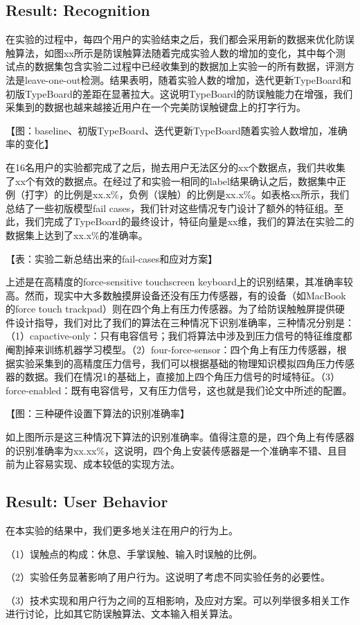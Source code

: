 \subsection{Result: Recognition}

在实验的过程中，每四个用户的实验结束之后，我们都会采用新的数据来优化防误触算法，如图xx所示是防误触算法随着完成实验人数的增加的变化，其中每个测试点的数据集包含实验二过程中已经收集到的数据加上实验一的所有数据，评测方法是leave-one-out检测。结果表明，随着实验人数的增加，迭代更新TypeBoard和初版TypeBoard的差距在显著拉大。这说明TypeBoard的防误触能力在增强，我们采集到的数据也越来越接近用户在一个完美防误触键盘上的打字行为。

【图：baseline、初版TypeBoard、迭代更新TypeBoard随着实验人数增加，准确率的变化】

在16名用户的实验都完成了之后，抛去用户无法区分的xx个数据点，我们共收集了xx个有效的数据点。在经过了和实验一相同的label结果确认之后，数据集中正例（打字）的比例是xx.x\%，负例（误触）的比例是xx.x\%。如表格xx所示，我们总结了一些初版模型fail cases，我们针对这些情况专门设计了额外的特征组。至此，我们完成了TypeBoard的最终设计，特征向量是xx维，我们的算法在实验二的数据集上达到了xx.x\%的准确率。

【表：实验二新总结出来的fail-cases和应对方案】

上述是在高精度的force-sensitive touchscreen keyboard上的识别结果，其准确率较高。然而，现实中大多数触摸屏设备还没有压力传感器，有的设备（如MacBook的force touch trackpad）则在四个角上有压力传感器。为了给防误触触屏提供硬件设计指导，我们对比了我们的算法在三种情况下识别准确率，三种情况分别是：（1）capactive-only：只有电容信号；我们将算法中涉及到压力信号的特征维度都阉割掉来训练机器学习模型。（2）four-force-sensor：四个角上有压力传感器，根据实验采集到的高精度压力信号，我们可以根据基础的物理知识模拟四角压力传感器的数据。我们在情况1的基础上，直接加上四个角压力信号的时域特征。（3）force-enabled：既有电容信号，又有压力信号，这也就是我们论文中所述的配置。

【图：三种硬件设置下算法的识别准确率】

如上图所示是这三种情况下算法的识别准确率。值得注意的是，四个角上有传感器的识别准确率为xx.xx\%，这说明，四个角上安装传感器是一个准确率不错、且目前为止容易实现、成本较低的实现方法。

\subsection{Result: User Behavior}

在本实验的结果中，我们更多地关注在用户的行为上。

（1）误触点的构成：休息、手掌误触、输入时误触的比例。

（2）实验任务显著影响了用户行为。这说明了考虑不同实验任务的必要性。

（3）技术实现和用户行为之间的互相影响，及应对方案。可以列举很多相关工作进行讨论，比如其它防误触算法、文本输入相关算法。
